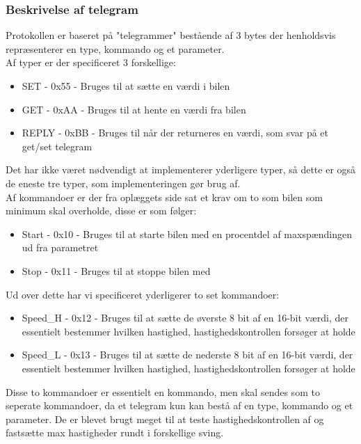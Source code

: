 \subsubsection{Beskrivelse af telegram}
Protokollen er baseret på "telegrammer" bestående af 3 bytes der henholdsvis repræsenterer en type, kommando og et parameter.\\
Af typer er der specificeret 3 forskellige:
\begin{itemize}[noitemsep,nolistsep,topsep=0ex]
	\item SET - 0x55 - Bruges til at sætte en værdi i bilen
	\item GET - 0xAA - Bruges til at hente en værdi fra bilen
	\item REPLY - 0xBB - Bruges til når der returneres en værdi, som svar på et get/set telegram
\end{itemize}
Det har ikke været nødvendigt at implementerer yderligere typer, så dette er også de eneste tre typer, som implementeringen gør brug af.\\
Af kommandoer er der fra oplæggets side sat et krav om to som bilen som minimum skal overholde, disse er som følger:
\begin{itemize}[noitemsep,nolistsep,topsep=0ex]
	\item Start - 0x10 - Bruges til at starte bilen med en procentdel af maxspændingen ud 			fra parametret
	\item Stop - 0x11 - Bruges til at stoppe bilen med
\end{itemize}

Ud over dette har vi specificeret yderligerer to set kommandoer:
\begin{itemize}[noitemsep,nolistsep,topsep=0ex]
	\item Speed\_H - 0x12 - Bruges til at sætte de øverste 8 bit af en 16-bit værdi, der essentielt bestemmer hvilken hastighed, hastighedskontrollen forsøger at holde
	\item Speed\_L - 0x13 - Bruges til at sætte de nederste 8 bit af en 16-bit værdi, der essentielt bestemmer hvilken hastighed, hastighedskontrollen forsøger at holde
\end{itemize}

Disse to kommandoer er essentielt en kommando, men skal sendes som to seperate kommandoer, da et telegram kun kan bestå af en type, kommando og et parameter. De er blevet brugt meget til at teste hastighedskontrollen af og fastsætte max hastigheder rundt i forskellige sving.\\

